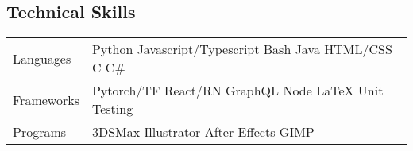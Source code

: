 \subsection*{Technical Skills}
\begin{indentsection}{\parindent}
\begin{tabular}{ m{2.2cm} | l }
 Languages &
    \quad Python \quad Javascript/Typescript \quad Bash \quad Java \quad HTML/CSS \quad C \quad C\#\\
 Frameworks &
	\quad Pytorch/TF \quad React/RN \quad GraphQL \quad Node \quad LaTeX \quad Unit Testing \\
 Programs &
 	\quad 3DSMax \quad Illustrator \quad After Effects \quad GIMP
\end{tabular}
\end{indentsection}
